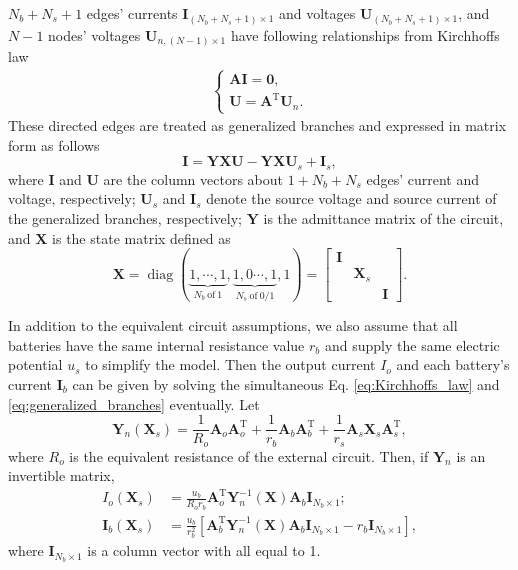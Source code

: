 \documentclass{article}
\DeclareMathOperator{\diag}{diag}
\def\T{\mathrm{T}}
\begin{document}
$N_b+N_s+1$ edges' currents $\bm{I}_{(N_b+N_s+1)\times 1}$ and voltages $\bm{U}_{(N_b+N_s+1)\times 1}$, and $N-1$ nodes' voltages $\bm{U}_{n, (N-1)\times 1}$ have following relationships from Kirchhoffs law
\begin{align}\label{eq:Kirchhoffs_law}
    \begin{cases}
        \bm{A} \bm{I} = \bm{0}, \\
        \bm{U}        = \bm{A}^\T \bm{U}_n.
    \end{cases}
\end{align}
These directed edges are treated as generalized branches and expressed in matrix form as follows
\begin{equation}\label{eq:generalized_branches}
    \bm{I} = \bm{Y}\bm{X} \bm{U} - \bm{Y}\bm{X} \bm{U}_s +\bm{I}_s,
\end{equation}
where $\bm{I}$ and $\bm{U}$ are the column vectors about $1+N_b+N_s$ edges' current and voltage, respectively;
$\bm{U}_s$ and $\bm{I}_s$ denote the source voltage and source current of the generalized branches, respectively;
$\bm{Y}$ is the admittance matrix of the circuit, and $\bm{X}$ is the state matrix defined as
\begin{equation}\label{eq:X}
    \bm{X} = \diag(
    \underbrace{1, \cdots, 1}_{N_b~\text{of}~1},
    \underbrace{1, 0 \cdots, 1}_{N_s~\text{of}~0/1},
    1)
    =\begin{bmatrix}
        \bm{I} & & \\
        & \bm{X}_s &\\
        & &\bm{I}
    \end{bmatrix}.
\end{equation}


In addition to the equivalent circuit assumptions, we also assume that all batteries have the same internal resistance value $r_b$ and supply the same electric potential $u_s$ to simplify the model.
Then the output current $I_o$ and each battery's current $\bm{I}_b$ can be given by solving the simultaneous Eq. \ref{eq:Kirchhoffs_law} and \ref{eq:generalized_branches} eventually.
Let
\begin{equation}\label{eq:Yn}
    \bm{Y}_n (\bm{X}_s) = \frac{1}{R_o} \bm{A}_o\bm{A}_o^\T + \frac{1}{r_b} \bm{A}_b\bm{A}_b^\T + \frac{1}{r_s}\bm{A}_s\bm{X}_s\bm{A}_s^\T,
\end{equation}
where $R_o$ is the equivalent resistance of the external circuit.
Then, if $\bm{Y}_n$ is an invertible matrix,
\begin{align}
    I_o(\bm{X}_s)      & = \frac{u_b}{R_o r_b} \bm{A}_o^\T \bm{Y}_n^{-1}(\bm{X}) \bm{A}_b \bm{I}_{N_b\times 1};\label{eq:I_o}\\
    \bm{I}_b(\bm{X}_s) & = \frac{u_b}{r_b^2}[\bm{A}_b^\T \bm{Y}_n^{-1}(\bm{X}) \bm{A}_b\bm{I}_{N_b \times 1}  -r_b \bm{I}_{N_b \times 1}],\label{eq:I_b}
\end{align}
where $\bm{I}_{N_b\times 1}$ is a column vector with all equal to 1.
\end{document}
